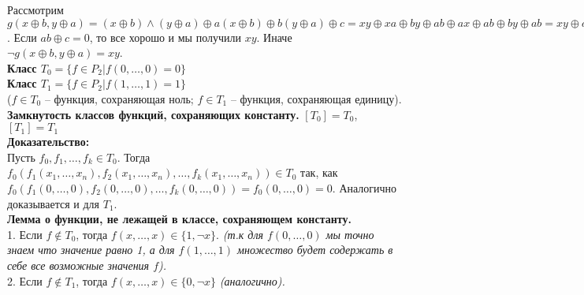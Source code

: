Рассмотрим $g(x \oplus b, y \oplus a) = (x \oplus b) \wedge (y \oplus a) \oplus a(x \oplus b) \oplus b(y \oplus a) \oplus c = xy \oplus xa \oplus by \oplus ab \oplus ax \oplus ab \oplus by \oplus ab = xy \oplus ab \oplus c$.
Если $ab \oplus c = 0$, то все хорошо и мы получили $xy$.
Иначе $\neg g(x \oplus b, y \oplus a) = xy$.\\

\textbf{Класс $T_0 = \{f \in P_2 | f(0, \ldots, 0) = 0\}$}\\

\textbf{Класс $T_1 = \{f \in P_2 | f(1, \ldots, 1) = 1\}$}\\

($f \in T_0$ -- функция, сохраняющая ноль; $f \in T_1$ -- функция, сохраняющая единицу).\\

\textbf{Замкнутость классов функций, сохраняющих константу.} $[T_0] = T_0$, $[T_1] = T_1$\\

\noindent \textbf{Доказательство:}\\

Пусть $f_0, f_1, \ldots, f_k \in T_0$. Тогда $f_0 (f_1(x_1, \ldots, x_n), f_2(x_1, \ldots, x_n), \ldots, f_k(x_1, \ldots, x_n)) \in T_0$ так, как $f_0 (f_1 (0, \ldots, 0), f_2 (0, \ldots, 0), \ldots, f_k (0, \ldots, 0)) = f_0 (0, \ldots, 0) = 0$.
Аналогично доказывается и для $T_1$.\\

\textbf{Лемма о функции, не лежащей в классе, сохраняющем константу.}\\

1. Если $f \notin T_0$, тогда $f (x, \ldots, x) \in \{1, \neg x\}$. \textit{(т.к для $f (0, \ldots, 0)$ мы точно знаем что значение равно 1, а для $f (1, \ldots, 1)$ множество будет содержать в себе все возможные значения $f$).}\\

2. Если $f \notin T_1$, тогда $f (x, \ldots, x) \in \{0, \neg x\}$ \textit {(аналогично).}

